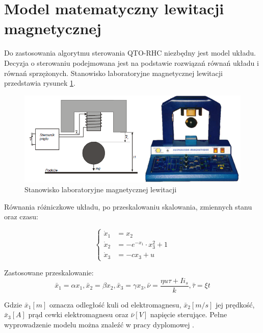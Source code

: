\section{Model matematyczny lewitacji magnetycznej}

Do zastosowania algorytmu sterowania QTO-RHC niezbędny jest model układu. Decyzja o sterowaniu podejmowana jest na podstawie rozwiązań równań układu i równań sprzężonych. Stanowisko laboratoryjne magnetycznej lewitacji przedstawia rysunek \ref{rys:maglev}.

\begin{figure}[!htb]
  \begin{center}
    \includegraphics[scale=0.85]{img/maglev.PNG}
    \caption{Stanowisko laboratoryjne magnetycznej lewitacji}
  \end{center}
  
  \label{rys:maglev}
\end{figure}

Równania różniczkowe układu, po przeskalowaniu skalowania, zmiennych stanu oraz czasu:

\begin{equation} \label{maglev_rown}
  \begin{cases}
    \dot{x}_1 & = x_2 \\
    \dot{x}_2 & = -e^{-x_1} \cdot x_3^2 + 1 \\
    \dot{x}_3 & = -cx_3 + u
    \end{cases}
\end{equation}

Zastosowane przeskalowanie:
\begin{equation}
\bar{x}_1 = \alpha x_1,
\bar{x}_2 = \beta x_2,
\bar{x}_3 = \gamma x_3,
\bar{\nu} = \frac{\eta u \tau + I i_s}{k},
\bar{\tau} = \xi t
\end{equation}

Gdzie $\bar{x}_1 [m]$ oznacza odległość kuli od elektromagnesu, $\bar{x}_2 [m/s]$ jej prędkość,  $\bar{x}_3 [A]$ prąd cewki elektromagnesu oraz $\bar{\nu} [V]$ napięcie sterujące. Pełne wyprowadzenie modelu można znaleźć w pracy dyplomowej \cite{Bania1999}.
 

